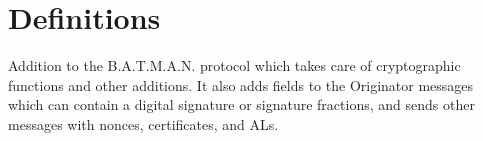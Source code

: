 \chapter*{Definitions}

\begin{acronym}




	Addition to the B.A.T.M.A.N. protocol which takes care of cryptographic
	functions and other additions. It also adds fields to the Originator messages
	which can contain a digital signature or signature fractions, and sends other
	messages with nonces, certificates, and ALs.











\end{acronym}
